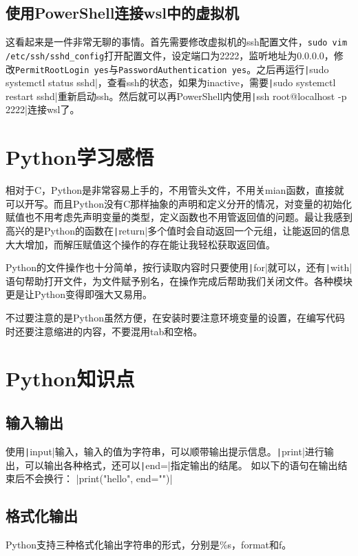 \documentclass[fontset=ubuntu]{ctexart}
\begin{document}
\subsection{使用PowerShell连接wsl中的虚拟机}
这看起来是一件非常无聊的事情。首先需要修改虚拟机的ssh配置文件，\verb|sudo vim /etc/ssh/sshd_config|打开配置文件，设定端口为2222，监听地址为0.0.0.0，修改\verb|PermitRootLogin yes|与\verb|PasswordAuthentication yes|。之后再运行\texttt|sudo systemctl status sshd|，查看ssh的状态，如果为inactive，需要\texttt|sudo systemctl restart sshd|重新启动ssh。然后就可以再PowerShell内使用\texttt|ssh root@localhost -p 2222|连接wsl了。

\section{Python学习感悟}
相对于C，Python是非常容易上手的，不用管头文件，不用关mian函数，直接就可以开写。而且Python没有C那样抽象的声明和定义分开的情况，对变量的初始化赋值也不用考虑先声明变量的类型，定义函数也不用管返回值的问题。最让我感到高兴的是Python的函数在\texttt|return|多个值时会自动返回一个元组，让能返回的信息大大增加，而解压赋值这个操作的存在能让我轻松获取返回值。

Python的文件操作也十分简单，按行读取内容时只要使用\texttt|for|就可以，还有\texttt|with|语句帮助打开文件，为文件赋予别名，在操作完成后帮助我们关闭文件。各种模块更是让Python变得即强大又易用。

不过要注意的是Python虽然方便，在安装时要注意环境变量的设置，在编写代码时还要注意缩进的内容，不要混用tab和空格。

\section{Python知识点}
\subsection{输入输出}
使用\texttt|input|输入，输入的值为字符串，可以顺带输出提示信息。\texttt|print|进行输出，可以输出各种格式，还可以\texttt|end=|指定输出的结尾。
如以下的语句在输出结束后不会换行：
|print("hello", end="")|

\subsection{格式化输出}
Python支持三种格式化输出字符串的形式，分别是\%s，format和f。
\end{document}
